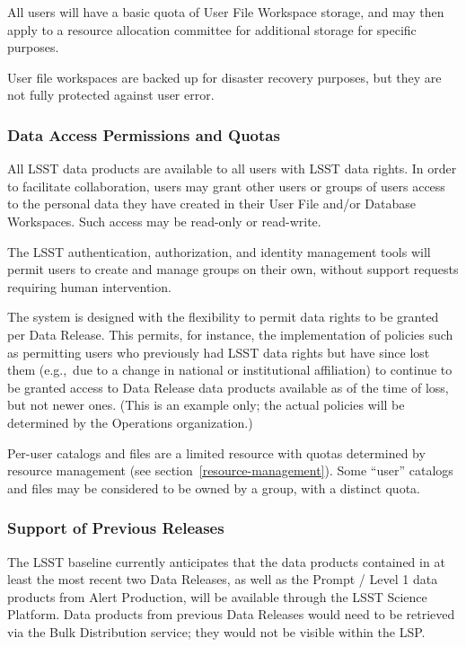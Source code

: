 All users will have a basic quota of User File Workspace storage, and may then
apply to a resource allocation committee for additional storage for specific
purposes.

User file workspaces are backed up for disaster recovery purposes, but they are
not fully protected against user error.

\subsubsection{Data Access Permissions and Quotas}\label{data-access-permissions-and-quotas}

All LSST data products are available to all users with LSST data rights.
In order to facilitate collaboration,
users may grant other users or groups of users access to the personal data
they have created in their User File and/or Database Workspaces.
Such access may be read-only or read-write.

The LSST authentication, authorization, and identity management tools will
permit users to create and manage groups on their own, without support requests
requiring human intervention.

The system is designed with the flexibility to permit data rights to be
granted per Data Release.
This permits, for instance, the implementation of policies such as permitting
users who previously had LSST data rights but have since lost them
(e.g.,\ due to a change in national or institutional affiliation)
to continue to be granted access to Data Release data products
available as of the time of loss, but not newer ones.
(This is an example only; the actual policies will be determined by the
Operations organization.)

Per-user catalogs and files are a limited resource with quotas determined by
resource management (see section~\ref{resource-management}).
Some ``user'' catalogs and files may be considered to be owned by a group,
with a distinct quota.

\subsubsection{Support of Previous Releases}\label{support-of-previous-releases}

The LSST baseline currently anticipates that the data products contained in
at least the most recent two Data Releases,
as well as the Prompt / Level 1 data products from Alert Production,
will be available through the LSST Science Platform.
Data products from previous Data Releases would need to be retrieved via the
Bulk Distribution service; they would not be visible within the LSP.

